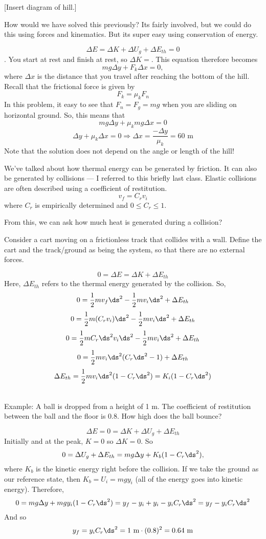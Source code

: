 [Insert diagram of hill.]

How would we have solved this previously? Its fairly involved, but we could do this using forces and kinematics. But its super easy using conservation of energy.

$$\Delta{E}=\Delta{K}+\Delta{U_g}+\Delta{E_{th}}=0$$.
You start at rest and finish at rest, so $\Delta{K}=$. This equation therefore becomes
$$mg\Delta{y}+F_k\Delta{x}=0,$$
where $\Delta{x}$ is the distance that you travel after reaching the bottom of the hill. Recall that the frictional force is given by
$$F_k=\mu_kF_n$$
In this problem, it easy to see that $F_n=F_g=mg$ when you are sliding on horizontal ground. So, this means that
$$mg\Delta{y}+\mu_k mg\Delta{x}=0$$
$$\Delta{y}+\mu_k \Delta{x}=0\Rightarrow \boxed{\Delta{x}=\frac{-\Delta{y}}{\mu_k}=60\mbox{ m}}$$
Note that the solution does not depend on the angle or length of the hill!



We've talked about how thermal energy can be generated by friction. It can also be generated by collisions --- I referred to this briefly last class. Elastic collisions are often described using a coefficient of restitution.
$$v_f=C_rv_i$$
where $C_r$ is empirically determined and $0\leq C_r \leq 1$.

From this, we can ask how much heat is generated during a collision?

Consider a cart moving on a frictionless track that collides with a wall. Define the cart and the track/ground as being the system, so that there are no external forces.

$$0=\Delta{E}=\Delta{K}+\Delta{E_{th}}$$
Here, $\Delta{E_{th}}$ refers to the thermal energy generated by the collision. So,
$$0=\frac{1}{2}mv_f\ds^2-\frac{1}{2}mv_i\ds^2+\Delta{E_{th}}$$
$$0=\frac{1}{2}m(C_rv_i)\ds^2-\frac{1}{2}mv_i\ds^2+\Delta{E_{th}}$$
$$0=\frac{1}{2}mC_r\ds^2v_i\ds^2-\frac{1}{2}mv_i\ds^2+\Delta{E_{th}}$$
$$0=\frac{1}{2}mv_i\ds^2(C_r\ds^2-1)+\Delta{E_{th}}$$
$$\Delta{E_{th}}=\frac{1}{2}mv_i\ds^2(1-C_r\ds^2)=K_i(1-C_r\ds^2)$$

\hrulefill\\
Example: A ball is dropped from a height of 1 m. The coefficient of restitution between the ball and the floor is 0.8. How high does the ball bounce?

$$\Delta{E}=0=\Delta{K}+\Delta{U_g}+\Delta{E_{th}}$$
Initially and at the peak, $K=0$ so $\Delta{K}=0$. So
$$0=\Delta{U_g}+\Delta{E_{th}}=mg\Delta{y}+K_b(1-C_r\ds^2),$$
where $K_b$ is the kinetic energy right before the collision. If we take the ground as our reference state, then $K_b=U_i=mgy_i$ (all of the energy goes into kinetic energy).  Therefore,
$$0=mg\Delta{y}+mgy_i(1-C_r\ds^2)=y_f-y_i+y_i-y_iC_r\ds^2=y_f-y_iC_r\ds^2$$
And so
$$y_f=y_iC_r\ds^2=1\mbox{ m}\cdot(0.8)^2=0.64\mbox{ m}$$


